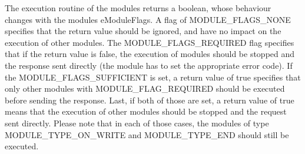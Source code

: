 The execution routine of the modules returns a boolean, whose behaviour changes with the module\textquotesingle{}s e\+Module\+Flags. A flag of M\+O\+D\+U\+L\+E\+\_\+\+F\+L\+A\+G\+S\+\_\+\+N\+O\+NE specifies that the return value should be ignored, and have no impact on the execution of other modules. The M\+O\+D\+U\+L\+E\+\_\+\+F\+L\+A\+G\+S\+\_\+\+R\+E\+Q\+U\+I\+R\+ED flag specifies that if the return value is false, the execution of modules should be stopped and the response sent directly (the module has to set the appropriate error code). If the M\+O\+D\+U\+L\+E\+\_\+\+F\+L\+A\+G\+S\+\_\+\+S\+U\+F\+F\+I\+C\+I\+E\+NT is set, a return value of true specifies that only other modules with M\+O\+D\+U\+L\+E\+\_\+\+F\+L\+A\+G\+\_\+\+R\+E\+Q\+U\+I\+R\+ED should be executed before sending the response. Last, if both of those are set, a return value of true means that the execution of other modules should be stopped and the request sent directly. Please note that in each of those cases, the modules of type M\+O\+D\+U\+L\+E\+\_\+\+T\+Y\+P\+E\+\_\+\+O\+N\+\_\+\+W\+R\+I\+TE and M\+O\+D\+U\+L\+E\+\_\+\+T\+Y\+P\+E\+\_\+\+E\+ND should still be executed. 